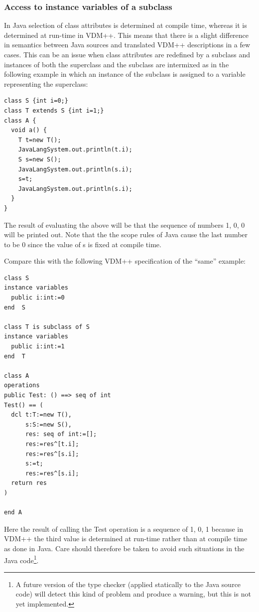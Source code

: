 \documentclass[\pformat,12pt]{article}
\begin{document}
\subsubsection{Access to instance variables of a subclass}

In Java selection of class attributes is determined at compile time,
whereas it is determined at run-time in VDM++. This means that there
is a slight difference in semantics between Java sources and
translated VDM++ descriptions in a few cases. This can be an issue when
class attributes are redefined by a subclass and instances of both the
superclass and the subclass are intermixed as in the following
example in which an instance of the subclass is assigned to a variable
representing the superclass:

\begin{small}
\begin{verbatim}
class S {int i=0;}
class T extends S {int i=1;}
class A {
  void a() {
    T t=new T();
    JavaLangSystem.out.println(t.i);  
    S s=new S();
    JavaLangSystem.out.println(s.i);  
    s=t;
    JavaLangSystem.out.println(s.i);  
  }
}
\end{verbatim}
\end{small}

The result of evaluating the above will be that the sequence of
numbers 1, 0, 0 will be printed out. Note that the the scope rules of
Java cause the last number to be 0 since the value of s is fixed at
compile time.

Compare this with the following VDM++ specification of the ``same''
example: 

\begin{small}
\begin{verbatim}
class S
instance variables
  public i:int:=0
end  S

class T is subclass of S
instance variables
  public i:int:=1
end  T

class A
operations
public Test: () ==> seq of int
Test() == (
  dcl t:T:=new T(),
      s:S:=new S(),
      res: seq of int:=[];
      res:=res^[t.i];
      res:=res^[s.i];
      s:=t;
      res:=res^[s.i];
  return res
)

end A
\end{verbatim}
\end{small}

Here the result of calling the Test operation is a sequence of 1, 0, 1
because in VDM++ the third value is determined at run-time rather
than at compile time as done in Java. Care should therefore be taken
to avoid such situations in the Java code\footnote{A future version
  of the type checker (applied statically to the Java source code)
  will detect this kind of problem and produce a warning, but this is 
not yet implemented.}.
\end{document}
